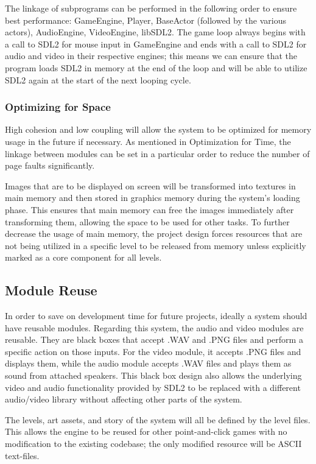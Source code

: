 \documentclass{article}
\begin{document}
      The linkage of subprograms can be performed in the following order to ensure best performance: GameEngine, Player, BaseActor (followed by the various actors), AudioEngine, VideoEngine, libSDL2. The game loop always begins with a call to SDL2 for mouse input in GameEngine and ends with a call to SDL2 for audio and video in their respective engines; this means we can ensure that the program loads SDL2 in memory at the end of the loop and will be able to utilize SDL2 again at the start of the next looping cycle.

		\subsubsection{Optimizing for Space}
      High cohesion and low coupling will allow the system to be optimized for memory usage in the future if necessary. As mentioned in Optimization for Time, the linkage between modules can be set in a particular order to reduce the number of page faults significantly.

      Images that are to be displayed on screen will be transformed into textures in main memory and then stored in graphics memory during the system's loading phase. This ensures that main memory can free the images immediately after transforming them, allowing the space to be used for other tasks. To further decrease the usage of main memory, the project design forces resources that are not being utilized in a specific level to be released from memory unless explicitly marked as a core component for all levels.

	\subsection{Module Reuse}
		In order to save on development time for future projects, ideally a system should have reusable modules. Regarding this system, the audio and video modules are reusable. They are black boxes that accept .WAV and .PNG files and perform a specific action on those inputs. For the video module, it accepts .PNG files and displays them, while the audio module accepts .WAV files and plays them as sound from attached speakers. This black box design also allows the underlying video and audio functionality provided by SDL2 to be replaced with a different audio/video library without affecting other parts of the system.

    The levels, art assets, and story of the system will all be defined by the level files. This allows the engine to be reused for other point-and-click games with no modification to the existing codebase; the only modified resource will be ASCII text-files.
\end{document}
